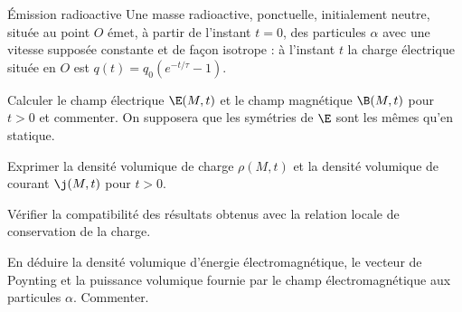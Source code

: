 \begin{exo}[PC][2][devoir]{Émission radioactive}
  Une masse radioactive, ponctuelle, initialement neutre, située au point $O$ émet, à partir de l’instant
  $t = 0$, des particules $\alpha$ avec une vitesse supposée constante et de façon isotrope : à l’instant $t$ la charge électrique située en $O$ est $q(t) = q_0 (e^{-t/\tau}-1).$
\begin{quest}
\item Calculer le champ électrique $\E(M,t)$ et le champ magnétique $\B(M,t)$ pour $t > 0$ et commenter. On supposera que les symétries de $\E$ sont les mêmes qu’en statique.
\item Exprimer la densité volumique de charge $\rho(M,t)$ et la densité volumique de courant $\j(M,t)$ pour
$t > 0$.
\item Vérifier la compatibilité des résultats obtenus avec la relation locale de conservation de la charge.
\item En déduire la densité volumique d’énergie électromagnétique, le vecteur de Poynting et la puissance volumique fournie par le champ électromagnétique aux particules $\alpha$. Commenter.
\end{quest}
\end{exo}


